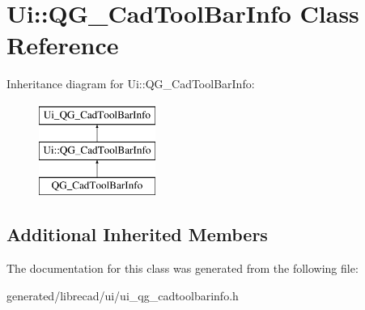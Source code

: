 \hypertarget{classUi_1_1QG__CadToolBarInfo}{\section{Ui\-:\-:Q\-G\-\_\-\-Cad\-Tool\-Bar\-Info Class Reference}
\label{classUi_1_1QG__CadToolBarInfo}
}
Inheritance diagram for Ui\-:\-:Q\-G\-\_\-\-Cad\-Tool\-Bar\-Info\-:\begin{figure}[H]
\begin{center}
\leavevmode
\includegraphics[height=3.000000cm]{classUi_1_1QG__CadToolBarInfo}
\end{center}
\end{figure}
\subsection*{Additional Inherited Members}


The documentation for this class was generated from the following file\-:\begin{DoxyCompactItemize}
\item 
generated/librecad/ui/ui\-\_\-qg\-\_\-cadtoolbarinfo.\-h\end{DoxyCompactItemize}
